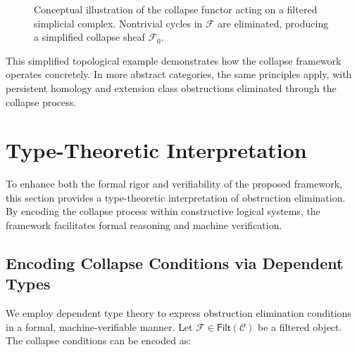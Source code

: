 \documentclass[11pt]{article}
\begin{document}
\begin{figure}[h]
\centering
{}
\caption{Conceptual illustration of the collapse functor acting on a filtered simplicial complex. Nontrivial cycles in $\mathcal{F}$ are eliminated, producing a simplified collapse sheaf $\mathcal{F}_0$.}
\label{fig:collapse}
\end{figure}

This simplified topological example demonstrates how the collapse framework operates concretely. In more abstract categories, the same principles apply, with persistent homology and extension class obstructions eliminated through the collapse process.



\section{Type-Theoretic Interpretation}

To enhance both the formal rigor and verifiability of the proposed framework, this section provides a type-theoretic interpretation of obstruction elimination. By encoding the collapse process within constructive logical systems, the framework facilitates formal reasoning and machine verification.

\subsection{Encoding Collapse Conditions via Dependent Types}

We employ dependent type theory to express obstruction elimination conditions in a formal, machine-verifiable manner. Let $\mathcal{F} \in \mathsf{Filt}(\mathcal{C})$ be a filtered object. The collapse conditions can be encoded as:
\end{document}
